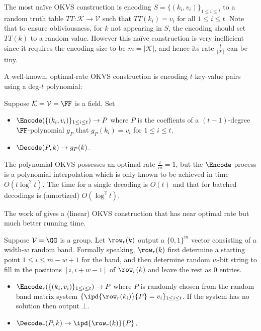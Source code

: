 The most na\"ive OKVS construction is encoding $S = \{(k_i, v_i)\}_{1\le i\le t}$ to a random truth table $TT:\mathcal{K}\rightarrow \mathcal{V}$ such that $TT(k_i) = v_i$ for all $1\le i\le t$. Note that to ensure obliviousness, for $k$ not appearing in $S$, the encoding should set $TT(k)$ to a random value. However this na\"ive construction is very inefficient since it requires the encoding size to be $m=|\mathcal{K}|$, and hence its rate $\frac{t}{|\mathcal{K}|}$ can be tiny. 

A well-known, optimal-rate OKVS construction is encoding $t$ key-value pairs using a deg-$t$ polynomial: 
\begin{construction}[Polynomial]\label{con:OKVS_polynomial}
  Suppose $\mathcal{K} = \mathcal{V}=\FF$ is a field. Set 
  \begin{itemize}
    \item $\Encode(\{(k_i,v_i)\}_{1\le i\le t}) \rightarrow P$ where $P$ is the coeffients of a $(t-1)$-degree $\FF$-polynomial $g_P$ that $g_P(k_i) = v_i$ for $1\le i\le t$. 
    \item $\Decode(P,k)\rightarrow g_P(k)$. 
  \end{itemize}
\end{construction}
The polynomial OKVS possesses an optimal rate $\frac{t}{m}=1$, but the $\Encode$ process is a polynomial interpolation which is only known to be achieved in time $O(t\log^2t)$. The time for a single decoding is $O(t)$ and that for batched decodings is (amortized) $O(\log^2 t)$. 

The work of \cite{cryptoeprint:2023/903} gives a (linear) OKVS construction that has near optimal rate but much better running time. 

\begin{construction}\label{con:OKVS_ribbon}
  Suppose $\mathcal{V} = \GG$ is a group. Let $\row_r(k)$ output a $\{0,1\}^m$ vector consisting of a width-$w$ random band. Formally speaking, $\row_r(k)$ first determine a starting point $1\le i\le m-w+1$ for the band, and then determine random $w$-bit string to fill in the positions $[i,i+w-1]$ of $\row_r(k)$ and leave the rest as 0 entries. 
  \begin{itemize}
    \item $\Encode_r(\{(k_i,v_i)\}_{1\le i\le t})\rightarrow P$ where $P$ is randomly chosen from the random band matrix system $\{\ipd{\row_r(k_i)}{P}=v_i\}_{1\le i\le t}$. If the system has no solution then output $\bot$. 
    \item $\Decode_r(P,k)\rightarrow \ipd{\row_r(k)}{P}$. 
  \end{itemize}
  
\end{construction}

